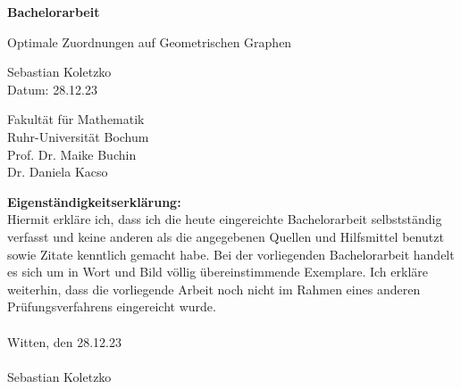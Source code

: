 \documentclass[a4paper, 12pt, twoside]{article}
\theoremstyle{Format1} %
\begin{document}
\newgeometry{} %
\begin{titlepage}
	\begin{center}
		\vspace*{1cm}

		\Huge
		\textbf{Bachelorarbeit}

		\vspace{0.5cm}
		\LARGE
		Optimale Zuordnungen auf Geometrischen Graphen

		\vspace{1.5cm}
		\large Sebastian Koletzko\\

		\vspace{1cm}
		Datum: 28.12.23

		\vfill

		\vspace{5cm}

		\large
		Fakultät für Mathematik
		\\
		Ruhr-Universität Bochum
		\\
		\vspace{0.5cm}
		Prof. Dr. Maike Buchin
		\\
		Dr. Daniela Kacso

	\end{center}
\end{titlepage}

\restoregeometry %

\newpage\null\thispagestyle{empty}\newpage %

\thispagestyle{empty} %

\textbf{Eigenständigkeitserklärung:}
\\
Hiermit erkläre ich, dass ich die heute eingereichte Bachelorarbeit selbstständig verfasst und keine anderen als die angegebenen Quellen und Hilfsmittel benutzt sowie Zitate kenntlich gemacht habe.
Bei der vorliegenden Bachelorarbeit handelt es sich um in Wort und Bild völlig übereinstimmende Exemplare. Ich erkläre weiterhin, dass die vorliegende Arbeit noch nicht im Rahmen eines anderen Prüfungsverfahrens eingereicht wurde.
\\
\\
Witten, den 28.12.23
\\
\\
Sebastian Koletzko
\end{document}
